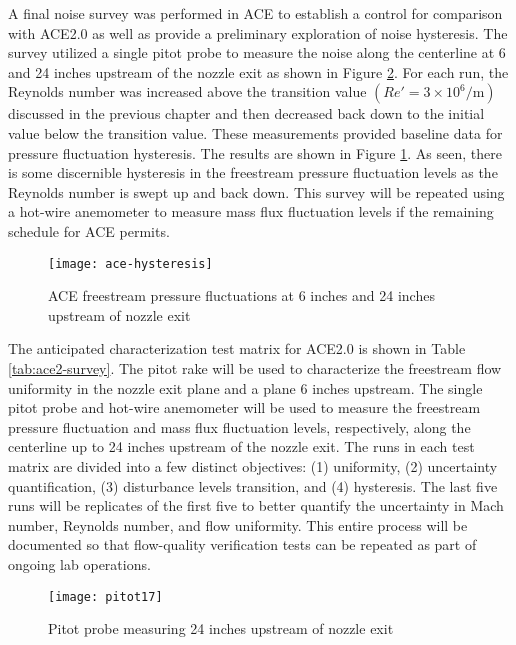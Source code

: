 A final noise survey was performed in ACE to establish a control for comparison with ACE2.0 as well as provide a preliminary exploration of noise hysteresis. The survey utilized a single pitot probe to measure the noise along the centerline at 6 and 24 inches upstream of the nozzle exit as shown in Figure \ref{fig:pitot17}. For each run, the Reynolds number was increased above the transition value $\left(Re' = 3 \times 10^6/\mathrm{m}\right)$ discussed in the previous chapter and then decreased back down to the initial value below the transition value. These measurements provided baseline data for pressure fluctuation hysteresis. The results are shown in Figure \ref{fig:ace-hysteresis}. As seen, there is some discernible hysteresis in the freestream pressure fluctuation levels as the Reynolds number is swept up and back down. This survey will be repeated using a hot-wire anemometer to measure mass flux fluctuation levels if the remaining schedule for ACE permits.

\begin{figure}[ht!]
    \centering
    \texttt{[image: ace-hysteresis]}
    \caption{ACE freestream pressure fluctuations at 6 inches and 24 inches upstream of nozzle exit}
    \label{fig:ace-hysteresis}
\end{figure}

The anticipated characterization test matrix for ACE2.0 is shown in Table \ref{tab:ace2-survey}. The pitot rake will be used to characterize the freestream flow uniformity in the nozzle exit plane and a plane 6 inches upstream. The single pitot probe and hot-wire anemometer will be used to measure the freestream pressure fluctuation and mass flux fluctuation levels, respectively, along the centerline up to 24 inches upstream of the nozzle exit. The runs in each test matrix are divided into a few distinct objectives: (1) uniformity, (2) uncertainty quantification, (3) disturbance levels transition, and (4) hysteresis. The last five runs will be replicates of the first five to better quantify the uncertainty in Mach number, Reynolds number, and flow uniformity. This entire process will be documented so that flow-quality verification tests can be repeated as part of ongoing lab operations.

\begin{figure}[ht!]
    \centering
    \texttt{[image: pitot17]}
    \caption{Pitot probe measuring 24 inches upstream of nozzle exit}
    \label{fig:pitot17}
\end{figure}

